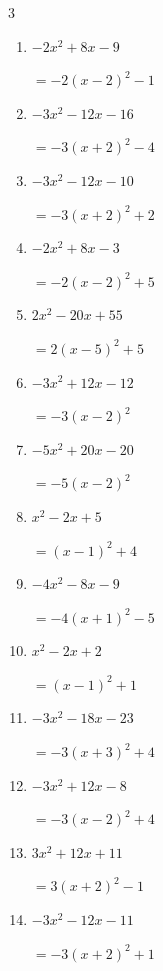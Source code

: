 \begin{multicols}{3}
\begin{enumerate}
  \item $-2x^{2}+8x-9$

        $=-2\left( x-2\right)^{2}-1$

  \item $-3x^{2}-12x-16$

        $=-3\left( x+2\right)^{2}-4$

  \item $-3x^{2}-12x-10$

        $=-3\left( x+2\right)^{2}+2$

  \item $-2x^{2}+8x-3$

        $=-2\left( x-2\right)^{2}+5$

  \item $2x^{2}-20x+55$

        $=2\left( x-5\right)^{2}+5$

  \item $-3x^{2}+12x-12$

        $=-3\left( x-2\right)^{2}$

  \item $-5x^{2}+20x-20$

        $=-5\left( x-2\right)^{2}$

  \item $x^{2}-2x+5$

        $=\left( x-1\right)^{2}+4$

  \item $-4x^{2}-8x-9$

        $=-4\left( x+1\right)^{2}-5$

\columnbreak %

  \item $x^{2}-2x+2$

        $=\left( x-1\right)^{2}+1$

  \item $-3x^{2}-18x-23$

        $=-3\left( x+3\right)^{2}+4$

  \item $-3x^{2}+12x-8$

        $=-3\left( x-2\right)^{2}+4$

  \item $3x^{2}+12x+11$

        $=3\left( x+2\right)^{2}-1$

  \item $-3x^{2}-12x-11$

        $=-3\left( x+2\right)^{2}+1$


\end{enumerate}
\end{multicols}
